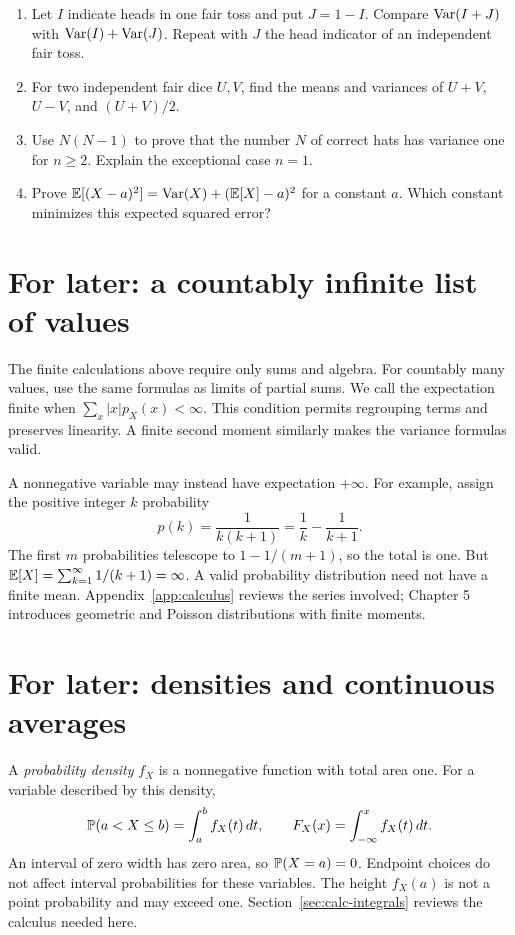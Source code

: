 \begin{exercisebox}
\begin{enumerate}
 of $2U-3$. 
 \item Let $I$ indicate heads in one fair toss and put $J=1-I$.
 Compare $\Var(I+J)$ with $\Var(I)+\Var(J)$.
 Repeat with $J$ the head indicator of an independent fair toss.
 \item For two independent fair dice $U,V$, find the means and variances
 of $U+V$, $U-V$, and $(U+V)/2$. 
 \item Use $N(N-1)$ to prove that the number $N$ of correct hats has
 variance one for $n\ge2$. Explain the exceptional case $n=1$.
 \item Prove $\E[(X-a)^2]=\Var(X)+(\E[X]-a)^2$ for a constant $a$.
 Which constant minimizes this expected squared error?
\end{enumerate}
\end{exercisebox}

\section{For later: a countably infinite list of values}
\label{sec:rv-countable}

The finite calculations above require only sums and algebra.
For countably many values, use the same formulas as limits of partial sums.
We call the expectation finite when $\sum_x|x|p_X(x)<\infty$.
This condition permits regrouping terms and preserves linearity.
A finite second moment similarly makes the variance formulas valid.

A nonnegative variable may instead have expectation $+\infty$.
For example, assign the positive integer $k$ probability
\[
 p(k)=\frac1{k(k+1)}=\frac1k-\frac1{k+1}.
\]
The first $m$ probabilities telescope to $1-1/(m+1)$, so the total is one.
But $\E[X]=\sum_{k=1}^{\infty}1/(k+1)=\infty$.
A valid probability distribution need not have a finite mean.
Appendix~\ref{app:calculus} reviews the series involved; Chapter 5
introduces geometric and Poisson distributions with finite moments.

\section{For later: densities and continuous averages}
\label{sec:rv-continuous}

A \emph{probability density} $f_X$ is a nonnegative function with total
area one. For a variable described by this density,
\[
 \P(a<X\le b)=\int_a^b f_X(t)\,dt,\qquad
 F_X(x)=\int_{-\infty}^x f_X(t)\,dt.
\]
An interval of zero width has zero area, so $\P(X=a)=0$.
Endpoint choices do not affect interval probabilities for these variables.
The height $f_X(a)$ is not a point probability and may exceed one.
Section~\ref{sec:calc-integrals} reviews the calculus needed here.

